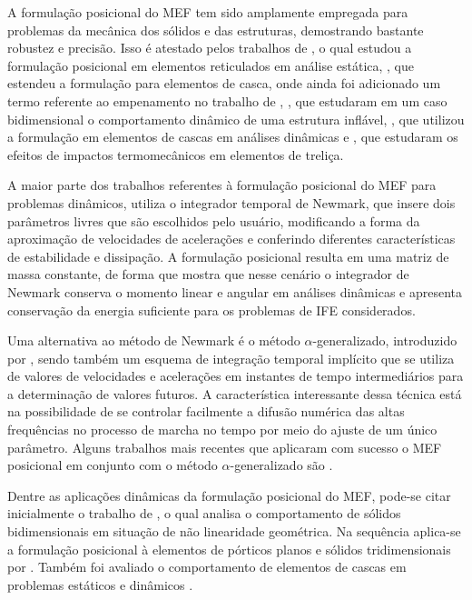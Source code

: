 A formulação posicional do MEF tem sido amplamente empregada para problemas da mecânica dos sólidos e das estruturas, demostrando bastante robustez e precisão. Isso é atestado pelos trabalhos de , o qual estudou a formulação posicional em elementos reticulados em análise estática, , que estendeu a formulação para elementos de casca, onde ainda foi adicionado um termo referente ao empenamento no trabalho de , , que estudaram em um caso bidimensional o comportamento dinâmico de uma estrutura inflável, , que utilizou a formulação em elementos de cascas em análises dinâmicas e , que estudaram os efeitos de impactos termomecânicos em elementos de treliça.

A maior parte dos trabalhos referentes à formulação posicional do MEF para problemas dinâmicos, utiliza o integrador temporal de Newmark, que insere dois parâmetros livres que são escolhidos pelo usuário, modificando a forma da aproximação de velocidades de acelerações e conferindo diferentes características de estabilidade e dissipação. A formulação posicional resulta em uma matriz de massa constante, de forma que  mostra que nesse cenário o integrador de Newmark conserva o momento linear e angular em análises dinâmicas e apresenta conservação da energia suficiente para os problemas de IFE considerados.

Uma alternativa ao método de Newmark é o método $\alpha$-generalizado, introduzido por , sendo também um esquema de integração temporal implícito que se utiliza de valores de velocidades e acelerações em instantes de tempo intermediários para a determinação de valores futuros. A característica interessante dessa técnica está na possibilidade de se controlar facilmente a difusão numérica das altas frequências no processo de marcha no tempo por meio do ajuste de um único parâmetro. Alguns trabalhos mais recentes que aplicaram com sucesso o MEF posicional em conjunto com o método $\alpha$-generalizado são .

Dentre as aplicações dinâmicas da formulação posicional do MEF, pode-se citar inicialmente o trabalho de , o qual analisa o comportamento de sólidos bidimensionais em situação de não linearidade geométrica. Na sequência aplica-se a formulação posicional à elementos de pórticos planos e sólidos tridimensionais por . Também foi avaliado o comportamento de elementos de cascas em problemas estáticos \cite{coda2007alternative} e dinâmicos \cite{coda2009unconstrained}.

